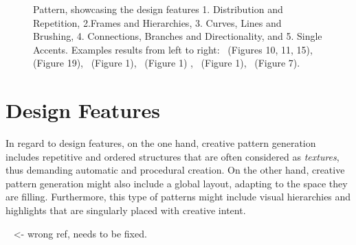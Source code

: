 


\begin{figure}
    \centering
        \label{fig:design_features}
        \caption{Pattern, showcasing the design features 1. Distribution and Repetition, 2.Frames and Hierarchies, 3. Curves, Lines and Brushing, 4. Connections, Branches and Directionality, and 5. Single Accents. Examples results from left to right:~\cite{loi_2017_pae} (Figures 10, 11, 15)\color{red}{Status rights: not started},~\cite{lu_2014_dds} (Figure 19),~\cite{jacobs_2018_dbe} (Figure 1),~\cite{guo_2020_ipm} (Figure 1) \color{orange}{Status rights: invoice received},~\cite{saputra_2017_ffo} (Figure 1),\color{black}~\cite{gieseke_2017_ooo} (Figure 7).}
\end{figure}


\section{Design Features}\label{sec:design}
In regard to design features, on the one hand, creative pattern generation includes repetitive and ordered structures that are often considered as \textit{textures}, thus demanding automatic and procedural creation. On the other hand, creative pattern generation might also include a global layout, adapting to the space they are filling. Furthermore, this type of patterns might include visual hierarchies and highlights that are singularly placed with creative intent. 

  ~ <- wrong ref, needs to be fixed. 



